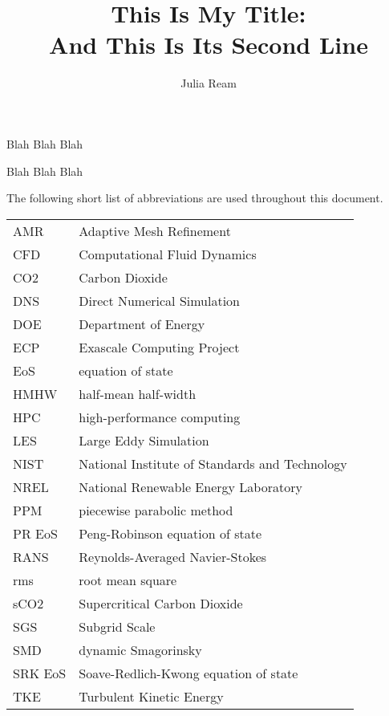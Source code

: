 \documentclass[11pt,expanded,copyright]{fsuthesis}
\title{This Is My Title:\protect\\And This Is Its Second Line}
\author{Julia Ream}
\begin{document}
\frontmatter
\maketitle
\makecommitteepage

\begin{dedication}
Blah Blah Blah
\end{dedication}

\begin{acknowledgments}
Blah Blah Blah
\end{acknowledgments}

\tableofcontents
\listoftables
\listoffigures



\begin{listofabbrevs}
The following short list of abbreviations are used throughout this document. 
\begin{center}
\begin{tabular}{ll}
AMR& Adaptive Mesh Refinement \\
CFD& Computational Fluid Dynamics \\
CO2& Carbon Dioxide \\
DNS& Direct Numerical Simulation \\
DOE& Department of Energy \\
ECP& Exascale Computing Project \\
EoS& equation of state \\
HMHW& half-mean half-width \\
HPC& high-performance computing \\
LES& Large Eddy Simulation \\
NIST& National Institute of Standards and Technology \\
NREL& National Renewable Energy Laboratory \\
PPM& piecewise parabolic method \\
PR EoS& Peng-Robinson equation of state \\
RANS& Reynolds-Averaged Navier-Stokes \\
rms& root mean square \\
sCO2& Supercritical Carbon Dioxide \\
SGS& Subgrid Scale \\
SMD& dynamic Smagorinsky \\
SRK EoS& Soave-Redlich-Kwong equation of state \\
TKE& Turbulent Kinetic Energy \\





\end{tabular}
\end{center}
\end{listofabbrevs}
\end{document}
